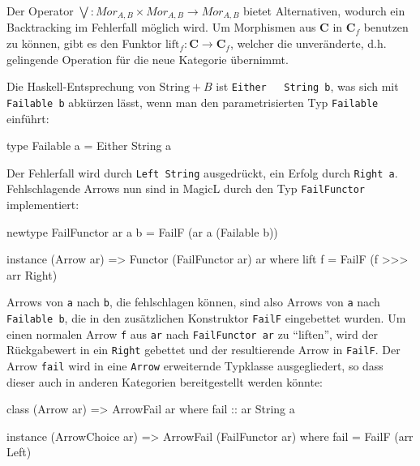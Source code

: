 \documentclass[11pt, a4paper, bibgerm]{scrbook}
\newenvironment{DIFnomarkup}{}{}
\newcommand\icode[1]{\lstinline?#1?}
\newcommand\ato{\rightarrow} %
\begin{document}
Der Operator $\bigvee : Mor_{A,B} \times Mor_{A,B}
\rightarrow Mor_{A,B} $ bietet Alternativen, wodurch ein Backtracking im
Fehlerfall möglich wird. Um Morphismen aus
$\mathbf{C}$ in $\mathbf{C}_f$ benutzen zu können, gibt es den Funktor
$\mathrm{lift}_f:\mathbf{C} \ato \mathbf{C}_f$, welcher die
unveränderte, d.h. gelingende Operation für die neue Kategorie
übernimmt.

Die Haskell-Entsprechung von $\mathrm{String}+B$ ist \icode{Either
  String b}, was sich mit \icode{Failable b} abkürzen lässt, wenn man
den parametrisierten Typ \icode{Failable} einführt:

\begin{DIFnomarkup}\begin{code}
type Failable a = Either String a
\end{code}\end{DIFnomarkup}

Der Fehlerfall wird durch \icode{Left String} ausgedrückt, ein Erfolg
durch \icode{Right a}. Fehlschlagende Arrows nun sind in MagicL durch den
Typ \icode{FailFunctor} implementiert:

\begin{DIFnomarkup}\begin{code}
newtype FailFunctor ar a b = FailF (ar a (Failable b))

instance (Arrow ar) => Functor (FailFunctor ar) ar where
    lift f = FailF (f >>> arr Right)
\end{code}\end{DIFnomarkup} %

Arrows von \icode{a} nach \icode{b}, die fehlschlagen können, sind also
Arrows von \icode{a} nach \icode{Failable b}, die in den zusätzlichen
Konstruktor \icode{FailF} eingebettet wurden. Um einen normalen Arrow
\icode{f} aus \icode{ar} nach \icode{FailFunctor ar} zu "`liften"', wird
der Rückgabewert in ein \icode{Right} gebettet und der resultierende
Arrow in \icode{FailF}.
Der Arrow \icode{fail} wird in eine \icode{Arrow} erweiternde Typklasse
ausgegliedert, so dass dieser auch in anderen Kategorien bereitgestellt
werden könnte:

\begin{DIFnomarkup}\begin{code}
class (Arrow ar) => ArrowFail ar where
  fail :: ar String a

instance (ArrowChoice ar) => ArrowFail (FailFunctor ar) where
  fail = FailF (arr Left)
\end{code}\end{DIFnomarkup}
\end{document}
